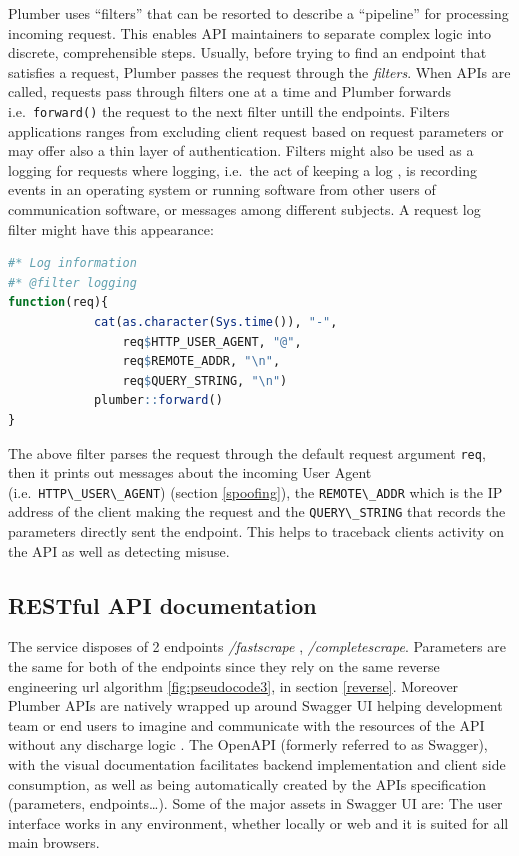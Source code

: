 \documentclass[
  12pt,
  a4paper,
  oneside]{book}
\newcommand{\passthrough}[1]{#1}
\theoremstyle{definition}
\theoremstyle{definition}
\theoremstyle{definition}
\theoremstyle{remark}
\begin{document}
Plumber uses ``filters'' that can be resorted to describe a ``pipeline'' for processing incoming request. This enables API maintainers to separate complex logic into discrete, comprehensible steps. Usually, before trying to find an endpoint that satisfies a request, Plumber passes the request through the \emph{filters}. When APIs are called, requests pass through filters one at a time and Plumber forwards i.e.~\passthrough{\lstinline!forward()!} the request to the next filter untill the endpoints. Filters applications ranges from excluding client request based on request parameters or may offer also a thin layer of authentication. Filters might also be used as a logging for requests where logging, i.e.~the act of keeping a log \citep{wiki:logging}, is recording events in an operating system or running software from other users of communication software, or messages among different subjects.
A request log filter might have this appearance:

\begin{lstlisting}[language=R]
#* Log information
#* @filter logging
function(req){
            cat(as.character(Sys.time()), "-",
                req$HTTP_USER_AGENT, "@", 
                req$REMOTE_ADDR, "\n",
                req$QUERY_STRING, "\n")
            plumber::forward()
}
\end{lstlisting}

The above filter parses the request through the default request argument \passthrough{\lstinline!req!}, then it prints out messages about the incoming User Agent (i.e.~\passthrough{\lstinline!HTTP\_USER\_AGENT!}) (section \ref{spoofing}), the \passthrough{\lstinline!REMOTE\_ADDR!} which is the IP address of the client making the request \citeyearpar{plumber} and the \passthrough{\lstinline!QUERY\_STRING!} that records the parameters directly sent the endpoint. This helps to traceback clients activity on the API as well as detecting misuse.

\hypertarget{docs}{%
\subsection{RESTful API documentation}\label{docs}}

The service disposes of 2 endpoints \emph{/fastscrape} , \emph{/completescrape}. Parameters are the same for both of the endpoints since they rely on the same reverse engineering url algorithm \ref{fig:pseudocode3}, in section \ref{reverse}. Moreover Plumber APIs are natively wrapped up around Swagger UI helping development team or end users to imagine and communicate with the resources of the API without any discharge logic \citep{swaggerUI}. The OpenAPI (formerly referred to as Swagger), with the visual documentation facilitates backend implementation and client side consumption, as well as being automatically created by the APIs specification (parameters, endpoints\ldots). Some of the major assets in Swagger UI are: The user interface works in any environment, whether locally or web and it is suited for all main browsers.
\end{document}

